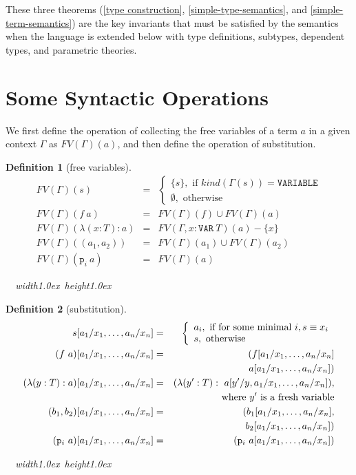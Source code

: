 \documentclass [12pt,twoside]{cslreport}
\newcommand{\thmbox}
   {{\ \hfill\hbox{%
      \vrule width1.0ex height1.0ex
   }\parfillskip 0pt }}
\newcommand{\union}{\cup}
\newcommand{\proj}[1]{\mathtt{p}_{#1}}
\newcommand{\listwo}[2]{#1_{1}, #1_{2}}
\newcommand{\ttvar}{\mathtt{VAR}}
\newcommand{\ttvariable}{\mathtt{VARIABLE}}
\newtheorem{definition}{Definition}
\newenvironment{Defn}[1]{\begin{definition}[#1]\label{defn:#1}}{
\thmbox\end{definition}}
\begin{document}
These three theorems (\ref{type construction},
\ref{simple-type-semantics}, and \ref{simple-term-semantics}) are the key
invariants that must be satisfied by the semantics when the language is
extended below with type definitions, subtypes, dependent types, and
parametric theories.

\section{Some Syntactic Operations}

We first define the operation of collecting the free variables of a
term $a$ in a given context $\Gamma$ as $FV(\Gamma)(a)$, and then
define the operation of substitution.
\begin{Defn}{free variables}
\begin{eqnarray*}
  FV(\Gamma)(s) & = & \left\{\begin{array}{l}
			      \{s \}, \mbox{ if } \textit{kind}(\Gamma(s))
= \ttvariable\\
                              \emptyset, \mbox{ otherwise}
			    \end{array}\right.\\
%
  FV(\Gamma)(f\ a) & = & FV(\Gamma)(f) \union FV(\Gamma)(a) \\
%
  FV(\Gamma)(\lambda (x : T) : a) & = &
     FV(\Gamma, x : \ttvar{}\ T)(a)
- \{x\} \\
%
 FV(\Gamma)((\listwo{a}{n})) & = & FV(\Gamma)(a_1)\union
FV(\Gamma)(a_2)\\
%
 FV(\Gamma)( \proj{i}\ a) & = & FV(\Gamma)(a)
\end{eqnarray*}
\end{Defn}
%
\begin{Defn}{substitution}
\begin{eqnarray*}
  s[a_1/x_1,\ldots, a_n/x_n] & = & \left\{\begin{array}{l}
					    a_i, \mbox{ if for some minimal } i,
s \equiv x_i\\
                                            s, \mbox{ otherwise}
					  \end{array}\right.\\
%
  (f\ a)[a_1/x_1,\ldots, a_n/x_n] & = &
     (f[a_1/x_1,\ldots, a_n/x_n]\\&&
       \hspace*{.5in} a[a_1/x_1,\ldots, a_n/x_n]) \\
%
  (\lambda (y : T): a)[a_1/x_1,\ldots, a_n/x_n] & = &
    (\lambda (y':T) :
     \ a[y'/y, a_1/x_1,\ldots, a_n/x_n]), \\ & & 
%
\mbox{where  } y' \mbox{ is a fresh variable}\\
%
 (\listwo{b}{m})[a_1/x_1,\ldots, a_n/x_n] & = &
     (b_1[a_1/x_1,\ldots, a_n/x_n],\\&&
       \hspace*{.5in}b_2[a_1/x_1,\ldots, a_n/x_n])\\
%
  ( \proj{i}\ a)[a_1/x_1,\ldots, a_n/x_n] & = &
   ( \proj{i}\ a[a_1/x_1,\ldots, a_n/x_n])
\end{eqnarray*}
\end{Defn}
\end{document}
